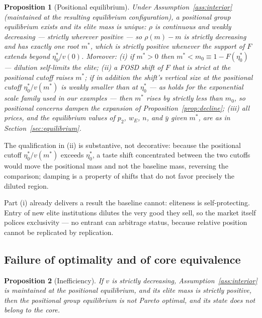 \documentclass[12pt,letterpaper]{article}
\newtheorem{proposition}{Proposition}
\theoremstyle{definition}
\begin{document}
\begin{proposition}[Positional equilibrium]\label{prop:positional} Under Assumption~\ref{ass:interior} (maintained at the resulting equilibrium configuration), a positional group equilibrium exists and its elite mass is unique: $\rho$ is continuous and weakly decreasing --- strictly wherever positive --- so $\rho(m)-m$ is strictly decreasing and has exactly one root $m^\ast$, which is strictly positive whenever the support of $F$ extends beyond $\eta^\ast_0/v(0)$.
Moreover: (i) if $m^\ast>0$ then $m^\ast < m_0 \equiv 1-F(\eta^\ast_0)$ --- dilution self-limits the elite; (ii) a FOSD shift of $F$ that is strict at the positional cutoff raises $m^\ast$; if in addition the shift's vertical size at the positional cutoff $\eta^\ast_0/v(m^\ast)$ is weakly smaller than at $\eta^\ast_0$ --- as holds for the exponential scale family used in our examples --- then $m^\ast$ rises by strictly less than $m_0$, so positional concerns dampen the expansion of Proposition~\ref{prop:decline}; (iii) all prices, and the equilibrium values of $p_2$, $w_E$, $n$, and $\bar{y}$ given $m^\ast$, are as in Section~\ref{sec:equilibrium}.
\end{proposition}

The qualification in (ii) is substantive, not decorative: because the positional cutoff $\eta^\ast_0/v(m^\ast)$ exceeds $\eta^\ast_0$, a taste shift concentrated between the two cutoffs would move the positional mass and not the baseline mass, reversing the comparison; damping is a property of shifts that do not favor precisely the diluted region.

Part (i) already delivers a result the baseline cannot: eliteness is self-protecting.
Entry of new elite institutions dilutes the very good they sell, so the market itself polices exclusivity --- no entrant can arbitrage status, because relative position cannot be replicated by replication.

\subsection{Failure of optimality and of core equivalence}

\begin{proposition}[Inefficiency]\label{prop:inefficiency} If $v$ is strictly decreasing, Assumption~\ref{ass:interior} is maintained at the positional equilibrium, and its elite mass is strictly positive, then the positional group equilibrium is not Pareto optimal, and its state does not belong to the core.
\end{proposition}
\end{document}
